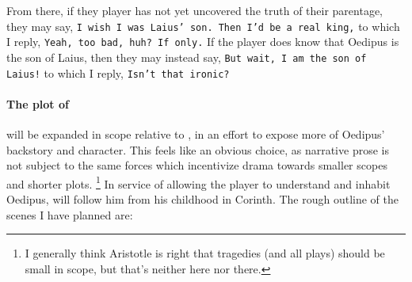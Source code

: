 
From there, if they player has not yet uncovered the truth of their parentage, they may
say, \texttt{I wish I was Laius' son. Then I'd be a real king,} to which I reply,
\texttt{Yeah, too bad, huh? If only.} If the player does know that Oedipus is the son of
Laius, then they may instead say, \texttt{But wait, I am the son of Laius!} to which I
reply, \texttt{Isn't that ironic?}

\paragraph*{The plot of \thegame{}} will be expanded in scope relative to \theplay{}, in
an effort to expose more of Oedipus' backstory and character. This feels like an obvious
choice, as narrative prose is not subject to the same forces which incentivize drama
towards smaller scopes and shorter plots. \footnote{I generally think Aristotle is right
  that tragedies (and all plays) should be small in scope, but that's neither here nor
  there.} In service of allowing the player to understand and inhabit Oedipus, \thegame{}
will follow him from his childhood in Corinth. The rough outline of the scenes I have
planned are:

